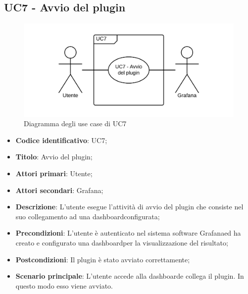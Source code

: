 \subsection{UC7 - Avvio del plugin}
\begin{figure}[H]
\includegraphics{img/UC7_-_Avvio_plugin.png}
\caption{Diagramma degli use case di UC7}
\end{figure}
\begin{itemize}
	\item \textbf{Codice identificativo}: UC7;
	\item \textbf{Titolo}: Avvio del plugin;
	\item \textbf{Attori primari}: Utente;
	\item \textbf{Attori secondari}: Grafana\glo;
	\item \textbf{Descrizione}: L'utente esegue l'attività di avvio del plugin che consiste nel suo collegamento ad una dashboard\glosp configurata;
	\item \textbf{Precondizioni}: L'utente è autenticato nel sistema software Grafana\glosp ed ha creato e configurato una dashboard\glosp per la visualizzazione del risultato;
	\item \textbf{Postcondizioni}: Il plugin è stato avviato correttamente;
	\item \textbf{Scenario principale}: L'utente accede alla dashboard\glosp e collega il plugin. In questo modo esso viene avviato.
\end{itemize}
